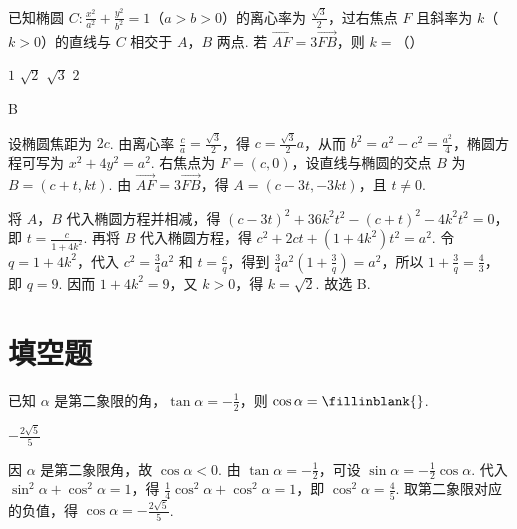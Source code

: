 \begin{problem}
已知椭圆 \(C: \frac{x^2}{a^2} + \frac{y^2}{b^2} = 1\)（\(a > b > 0\)）的离心率为 \(\frac{\sqrt{3}}{2}\)，过右焦点 \(F\) 且斜率为 \(k\)（\(k > 0\)）的直线与 \(C\) 相交于 \(A\)，\(B\) 两点. 若 \(\overrightarrow{AF} = 3\overrightarrow{FB}\)，则 \(k =\)（\quad）

\choices
    {\(1\)}
    {\(\sqrt{2}\)}
    {\(\sqrt{3}\)}
    {\(2\)}

\begin{answer}
B
\end{answer}

\begin{solution}
设椭圆焦距为 \(2c\). 由离心率 \(\frac{c}{a}=\frac{\sqrt{3}}{2}\)，得 \(c=\frac{\sqrt{3}}{2}a\)，从而 \(b^2=a^2-c^2=\frac{a^2}{4}\)，椭圆方程可写为 \(x^2+4y^2=a^2\). 右焦点为 \(F=(c,0)\)，设直线与椭圆的交点 \(B\) 为 \(B=(c+t,kt)\). 由 \(\overrightarrow{AF}=3\overrightarrow{FB}\)，得 \(A=(c-3t,-3kt)\)，且 \(t\ne0\).

将 \(A\)，\(B\) 代入椭圆方程并相减，得 \((c-3t)^2+36k^2t^2-(c+t)^2-4k^2t^2=0\)，即 \(t=\frac{c}{1+4k^2}\). 再将 \(B\) 代入椭圆方程，得 \(c^2+2ct+(1+4k^2)t^2=a^2\). 令 \(q=1+4k^2\)，代入 \(c^2=\frac{3}{4}a^2\) 和 \(t=\frac{c}{q}\)，得到 \(\frac{3}{4}a^2\left(1+\frac{3}{q}\right)=a^2\)，所以 \(1+\frac{3}{q}=\frac{4}{3}\)，即 \(q=9\). 因而 \(1+4k^2=9\)，又 \(k>0\)，得 \(k=\sqrt{2}\). 故选 B.
\end{solution}
\end{problem}

\section{填空题}

\begin{problem}
已知 \(\alpha\) 是第二象限的角，\(\tan \alpha = -\frac{1}{2}\)，则 \(\cos \alpha =\fillinblank{}\).
\end{problem}

\begin{answer}
\(-\frac{2\sqrt{5}}{5}\)
\end{answer}

\begin{solution}
因 \(\alpha\) 是第二象限角，故 \(\cos\alpha<0\). 由 \(\tan\alpha=-\frac{1}{2}\)，可设 \(\sin\alpha=-\frac{1}{2}\cos\alpha\). 代入 \(\sin^2\alpha+\cos^2\alpha=1\)，得 \(\frac{1}{4}\cos^2\alpha+\cos^2\alpha=1\)，即 \(\cos^2\alpha=\frac{4}{5}\). 取第二象限对应的负值，得 \(\cos\alpha=-\frac{2\sqrt{5}}{5}\).
\end{solution}


